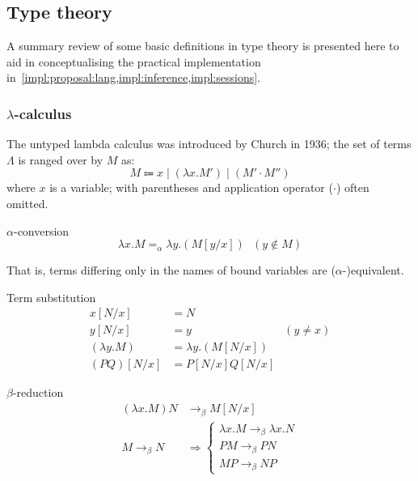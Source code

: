 \subsection{Type theory}\label{bg:types}

A summary review of some basic definitions in type theory is presented here to aid in conceptualising the practical implementation in~\cref{impl:proposal:lang,impl:inference,impl:sessions}.

\subsubsection{$\lambda$-calculus}\label{bg:types:lambda-calculus}
The untyped lambda calculus was introduced by Church in 1936; the set of terms $\Lambda$ is ranged over by $M$ as: $$
M \Coloneqq x \mid (\lambda{x}.M') \mid (M' \cdot M'')
$$ where $x$ is a variable; with parentheses and application operator ($\cdot$) often omitted. \cite{tsfpl}

\begin{defn}$\alpha$-conversion\label{def:types:alpha-conversion}
	$$
	\lambda{x}.M =_{\alpha} \lambda{y}.(M[y/x]) \ \ \ (y\notin{M})
	$$
\end{defn}

That is, terms differing only in the names of bound variables are ($\alpha$-)equivalent.

\begin{defn}Term substitution\label{def:types:term-substitution}
	$$
	\begin{aligned}
		x[N/x] &= N \\
		y[N/x] &= y &(y \neq x) \\
		(\lambda{y}.M) &= \lambda{y}.(M[N/x]) \\
		(PQ)[N/x] &= P[N/x]Q[N/x]
	\end{aligned}
	$$
\end{defn}

\begin{defn}$\beta$-reduction\label{def:types:beta-conversion}
	$$
	\begin{aligned}
		(\lambda{x}.M)N &\to_{\beta} M[N/x] \\
		M \to_{\beta} N &\Rightarrow \begin{cases}
 			\lambda{x}.M \to_{\beta} \lambda{x}.N \\
 			PM \to_{\beta} PN \\
 			MP \to_{\beta} NP
 		\end{cases}
	\end{aligned}
	$$
\end{defn}

